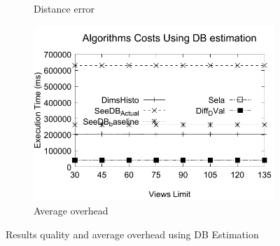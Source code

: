 \begin{figure}[t]
\begin{subfigure}[b]{0.32\textwidth}
    \caption{Distance error}
       \label{fig:figCost12}
  \end{subfigure}
  \begin{subfigure}[b]{0.32\textwidth}
    \includegraphics[width=\textwidth]{Cost21.pdf}
     \caption{Average overhead}
       \label{fig:figCost21}%
  \end{subfigure}
  \caption{Results quality and average overhead using DB Estimation}
\end{figure}
%
%
%
%
 
